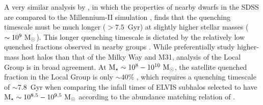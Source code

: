 A very similar analysis by \citet{wheeler14}, in which the properties
of nearby dwarfs in the SDSS are compared to the Millennium-II
simulation \citep{bk09}, finds that the quenching timescale must be
much longer ($>7.5$~Gyr) at slightly higher stellar masses
($\sim10^{9}~{\rm M}_{\odot}$). This longer quenching timescale is dictated by
the relatively low quenched fractions observed in nearby groups
\citep{geha12}. While \citet{wheeler14} preferentially study
higher-mass host halos than that of the Milky Way and M31, analysis of
the Local Group is in broad agreement. At ${\rm M}_{\star} \sim
10^{8}-10^{10}~{\rm M}_{\odot}$, the satellite quenched fraction in the Local
Group is only $\sim40\%$ \citep{wheeler14, phillips15, slater14},
which requires a quenching timescale of $\sim7.8$~Gyr when comparing
the infall times of ELVIS subhalos selected to have ${\rm M}_{\star} \sim
10^{8.5}-10^{9.5}~{\rm M}_{\odot}$ according to the abundance matching relation
of \cite{gk14}.


